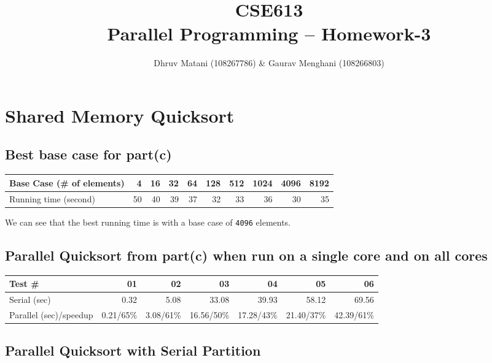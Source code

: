\documentclass{article}
\title{CSE613\\Parallel Programming -- Homework-3}
\author{Dhruv Matani (108267786) \& Gaurav Menghani (108266803)}
\begin{document}
\maketitle

\clearpage

\tableofcontents

\clearpage

\section{Shared Memory Quicksort}

\subsection{Best base case for part(c)}

\begin{center}
  \begin{tabular}{| l | r | r | r | r | r | r | r | r | r |}
    \hline
    Base Case (\# of elements) & 4 & 16 & 32 & 64 & 128 & 512 & 1024 & 4096 & 8192 \\ \hline
    Running time (second) & 50 & 40 & 39 & 37 & 32 & 33 & 36 & 30 & 35 \\ \hline
  \end{tabular}
\end{center}

We can see that the best running time is with a base case of \texttt{4096} elements.

\subsection{Parallel Quicksort from part(c) when run on a single core and on all cores}

\begin{center}
  \begin{tabular}{| l | r | r | r | r | r | r |}
    \hline
    Test \# & 01 & 02 & 03 & 04 & 05 & 06 \\ \hline
    Serial (sec)           & 0.32 & 5.08 & 33.08 & 39.93 & 58.12 & 69.56 \\ \hline
    Parallel (sec)/speedup & 0.21/65\% & 3.08/61\% & 16.56/50\% & 17.28/43\% & 21.40/37\% & 42.39/61\% \\ \hline
  \end{tabular}
\end{center}

\subsection{Parallel Quicksort with Serial Partition}
\end{document}
